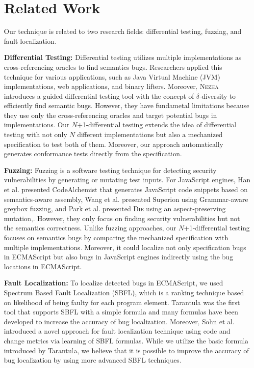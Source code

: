 \section{Related Work}\label{sec:related}

Our technique is related to two research fields: differential testing, fuzzing,
and fault localization.

\textbf{Differential Testing:} Differential testing\cite{???} utilizes multiple
implementations as cross-referencing oracles to find semantics bugs.
Researchers applied this technique for various applications, such as Java
Virtual Machine (JVM) implementations\cite{???}, web applications\cite{???},
and binary lifters\cite{ir-diff-test}.  Moreover, \textsc{Nezha} introduces a
guided differential testing tool with the concept of $\delta$-diversity to
efficiently find semantic bugs.  However, they have fundametal limitations because
they use only the cross-referencing oracles and target potential bugs in
implementations.  Our $N$+1-differential testing extends the idea of
differential testing with not only $N$ different implementations but also a
mechanized specification to test both of them.  Moreover, our approach
automatically generates conformance tests directly from the specification.

\textbf{Fuzzing:} Fuzzing is a software testing technique for detecting security
vulnerabilities by generating or mutating test inputs.  For JavaScript engines,
Han et al.\cite{codealchemist} presented CodeAlchemist that generates JavaScript
code snippets based on semantics-aware assembly, Wang et al.\cite{???}
presented Superion using Grammar-aware greybox fuzzing, and Park et
al.\cite{???} presented \textsc{Die} using an aspect-preserving mutation,.
However, they only focus on finding security vulnerabilities but not the
semantics correctness. Unlike fuzzing approaches, our $N$+1-differential testing
focuses on semantics bugs by comparing the mechanized specification with
multiple implementations.  Moreover, it could localize not only specification
bugs in ECMAScript but also bugs in JavaScript engines indirectly using the bug
locations in ECMAScript.


\textbf{Fault Localization:} To localize detected bugs in ECMAScript, we used
Spectrum Based Fault Localization (SBFL)\cite{???}, which is a ranking technique
based on likelihood of being faulty for each program element.
Tarantula\cite{???, ???} was the first tool that supports SBFL with a simple
formula and many formulas have been developed\cite{???} to increase the accuracy
of bug localization.  Moreover, Sohn et al.\cite{???} introduced a novel
approach for fault localization technique using code and change metrics via
learning of SBFL formulas.  While we utilize the basic formula introduced by
Tarantula, we believe that it is possible to improve the accuracy of bug
localization by using more advanced SBFL techniques.

